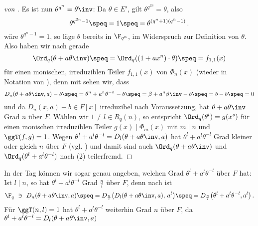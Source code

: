 \begin{proof}[von ]
  Es ist nun $\theta^{q^n} = \theta\inv$: 
  Da $\theta \in E'$, gilt $\theta^{q^{2n}} = \theta$, also
  \[ \theta^{q^{2n}-1} \speq= 1 \speq= \theta^{(q^n+1)(q^n-1)}\,. \]
  wäre $\theta^{q^n-1} = 1$, so läge $\theta$ bereits in $\F_{q^n}$, im Widerspruch
  zur Definition von $\theta$.
  Also haben wir nach  
  gerade 
  \[ \Ord_q(\theta + a\theta\inv) \speq=
    \Ord_q((1+ax^n)\cdot \theta) \speq= f_{1,1}(x)\]
  für einen monischen, irreduziblen Teiler $f_{1,1}(x)$ von $\Phi_n(x)$
  (wieder in Notation von ), denn
  mit  sehen wir, dass
  \[ D_n(\theta + a\theta\inv,a) -b \speq= \theta^n + a^n\theta^{-n} -b
    \speq= \beta +a^n\beta\inv -b \speq= b - b\speq= 0\]
  und da $D_n(x,a)-b \in F[x]$ irreduzibel nach Voraussetzung, hat
  $\theta + a\theta\inv$ Grad $n$ über $F$.
  Wählen wir $1 \neq l \in R_q(n)$, so entspricht 
  $\Ord_q(\theta^l) = g(x^s)$ für einen monischen irreduziblen Teiler 
  $g(x) \mid \Phi_m(x)$ mit $m\mid n$ und $\ggT(f,g) = 1$. 
  Wegen $\theta^l+a^l\theta^{-l} = D_l(\theta+a\theta\inv,a)$ hat 
  $\theta^l+a^l\theta^{-l}$ Grad kleiner oder gleich $n$ über $F$ 
  (vgl. )
  und damit sind auch
  $\Ord_q(\theta+a\theta\inv)$ und $\Ord_q(\theta^l+a^l\theta^{-l})$ 
  nach  (2) teilerfremd.
\end{proof}

\begin{bemerkung}
  \label{bem:grad_phi_l}
  In der Tag können wir sogar genau angeben, welchen Grad 
  $\theta^l+a^l\theta^{-l}$ über $F$ hat: Ist $l\mid n$, 
  so hat $\theta^l+a^l\theta^{-l}$ Grad $\tfrac n l$ über $F$, denn nach
   ist
  \[ \F_q\ \ni\ D_n(\theta + a \theta\inv, a) \speq= 
    D_{\frac n l}\big( D_l(\theta+a\theta\inv,a),\, a^l\big) \speq=
    D_{\frac n l}\big(\theta^l + a^l \theta^{-l}, a^l\big)\,.\]
  Für $\ggT(n,l) = 1$ hat $\theta^l + a^l\theta^{-l}$ weiterhin Grad $n$ über 
  $F$, da $\theta^l + a^l\theta^{-l} = D_l(\theta+a\theta\inv,a)$ 
\end{bemerkung}


